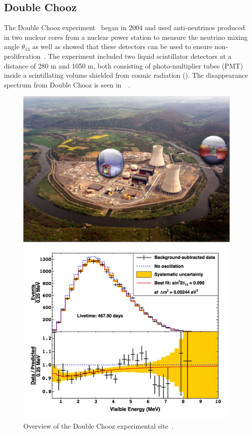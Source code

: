 \subsection{Double Chooz}
The Double Chooz experiment~\cite{127Abe, 128Abe} began in 2004 and used anti-neutrinos produced in two nuclear cores from a nuclear power station to measure the neutrino mixing angle $\theta_{13}$ as well as showed that these detectors can be used to ensure non-proliferation~\cite{45DoubleChooz, 66ReactorNP}. The experiment included two liquid scintillator detectors at a distance of 280 m and 1050 m, both consisting of photo-multiplier tubes (PMT) inside a scintillating volume shielded from cosmic radiation (). The disappearance spectrum from Double Chooz is seen in~~\cite{72Double}.

\begin{figure}[h!]
  \centering
  \begin{minipage}[b]{0.49\textwidth}
    \includegraphics[width=\textwidth]{figures/doubleChooz.jpeg}
    \vspace{2mm}
    \caption{Overview of the Double Chooz experimental site~\cite{45DoubleChooz}.}
    \label{fig:dc}
  \end{minipage}
  \hfill
  \begin{minipage}[b]{0.49\textwidth}
    \includegraphics[width=\textwidth]{figures/doubleChooz2.jpeg}

\end{minipage}
\end{figure}
